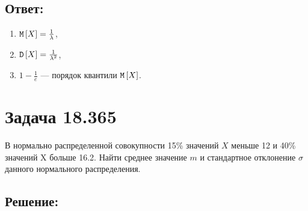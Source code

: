 \subsection*{Ответ:}
\begin{enumerate}
    \item $\mathtt{M} \left [ X \right ] = \frac{1}{\lambda}$,
    \item $\mathtt{D} \left [ X \right ] = \frac{1}{\lambda^2}$,
    \item $1 - \frac{1}{e}$ --- порядок квантили $\mathtt{M} \left [ X \right ]$.
\end{enumerate}

\section*{Задача 18.365}

В нормально распределенной совокупности 15\% значений $X$ меньше 12 и 40\% значений X больше 16.2. Найти среднее значение $m$ и стандартное отклонение $\sigma$ данного
нормального распределения.

\subsection*{Решение:}


